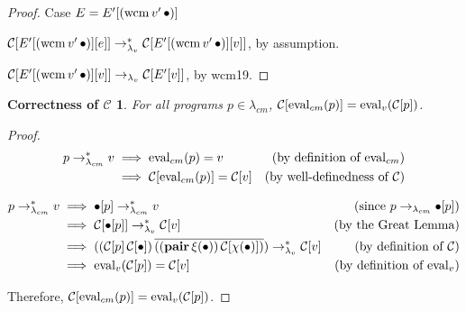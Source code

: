\begin{proof}{Case $E=E'[(\mathrm{wcm}\,v'\,\bullet)]$}

$\mathcal{C}[E'[(\mathrm{wcm}\,v'\,\bullet)][e]]\rightarrow_{\lambda_v}^{*}\mathcal{C}[E'[(\mathrm{wcm}\,v'\,\bullet)][v]]$, by assumption.

$\mathcal{C}[E'[(\mathrm{wcm}\,v'\,\bullet)][v]]\rightarrow_{\lambda_v} \mathcal{C}[E'[v]]$, by wcm19. 
\end{proof}

\newtheorem*{maintheorem}{Correctness of $\mathcal{C}$}
\begin{maintheorem}
For all programs $p\in\lambda_{cm}$, $\mathcal{C}[\mathrm{eval}_{cm}(p)]=\mathrm{eval}_{v}(\mathcal{C}[p])$.
\end{maintheorem}

\begin{proof}

\begin{align*}
p\rightarrow_{\lambda_{cm}}^{*} v &\implies\mathrm{eval}_{cm}(p)=v &\text{(by definition of $\mathrm{eval}_{cm}$)}\\
          &\implies\mathcal{C}[\mathrm{eval}_{cm}(p)]=\mathcal{C}[v] &\text{(by well-definedness of $\mathcal{C}$)}
\end{align*}







\begin{align*}
p\rightarrow_{\lambda_{cm}}^{*} v &\implies\bullet[p]\rightarrow_{\lambda_{cm}}^{*} v &\text{(since $p\rightarrow_{\lambda_{cm}}\bullet[p]$)}\\
          &\implies\mathcal{C}[\bullet[p]]\rightarrow_{\lambda_v}^{*}\mathcal{C}[v] &\text{(by the Great Lemma)}\\
          &\implies((\mathcal{C}[p]\,\mathcal{C}[\bullet])\,\overline{((\mathbf{pair}\,\xi(\bullet))\,\mathcal{C}[\chi(\bullet)])})\rightarrow_{\lambda_v}^{*}\mathcal{C}[v]&\text{(by definition of $\mathcal{C}$)}\\
          &\implies\mathrm{eval}_{v}(\mathcal{C}[p])=\mathcal{C}[v] &\text{(by definition of $\mathrm{eval}_v$)}
\end{align*}

Therefore, $\mathcal{C}[\mathrm{eval}_{cm}(p)]=\mathrm{eval}_{v}(\mathcal{C}[p])$.
\end{proof}

